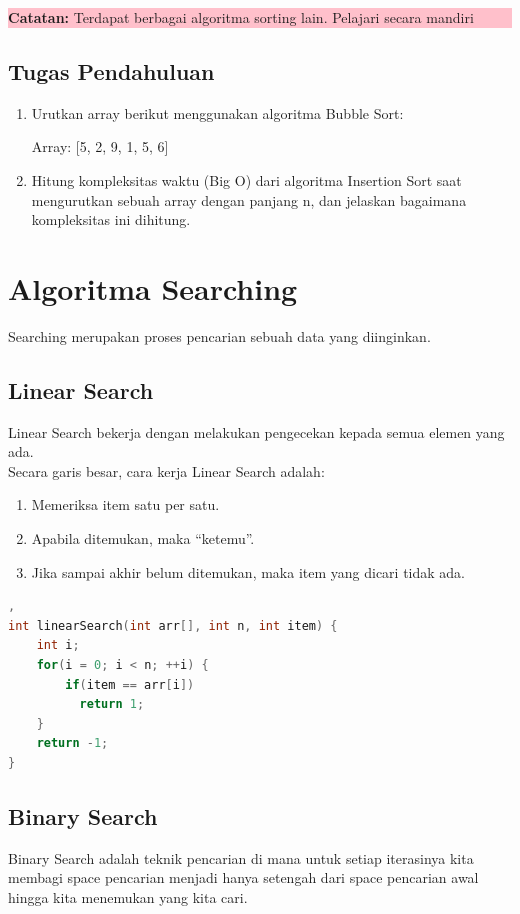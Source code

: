 \begin{center}
	\colorbox{pink}{\parbox{0.8\linewidth}{\textbf{Catatan:} Terdapat berbagai algoritma sorting lain. Pelajari secara mandiri}}
\end{center}

\subsection{Tugas Pendahuluan}
\begin{enumerate}
    \item Urutkan array berikut menggunakan algoritma Bubble Sort:

    Array: [5, 2, 9, 1, 5, 6]
    \item Hitung kompleksitas waktu (Big O) dari algoritma Insertion Sort saat mengurutkan sebuah array dengan panjang n, dan jelaskan bagaimana kompleksitas ini dihitung.
\end{enumerate}

\section{Algoritma Searching}
Searching merupakan proses pencarian sebuah data yang diinginkan.

\subsection{Linear Search}
Linear Search bekerja dengan melakukan pengecekan kepada semua elemen yang ada.\\
Secara garis besar, cara kerja Linear Search adalah:

\begin{enumerate}
    \item Memeriksa item satu per satu.
    \item Apabila ditemukan, maka “ketemu”.
    \item Jika sampai akhir belum ditemukan, maka item yang dicari tidak ada.
\end{enumerate}

\begin{lstlisting}[language=c,caption=Implementasi Linear Search], 
int linearSearch(int arr[], int n, int item) {
    int i;
    for(i = 0; i < n; ++i) {
        if(item == arr[i])
          return 1;
    }
    return -1;
}
\end{lstlisting}   

\subsection{Binary Search}
Binary Search adalah teknik pencarian di mana untuk setiap iterasinya kita membagi space pencarian menjadi hanya setengah 
dari space pencarian awal hingga kita menemukan yang kita cari.    

